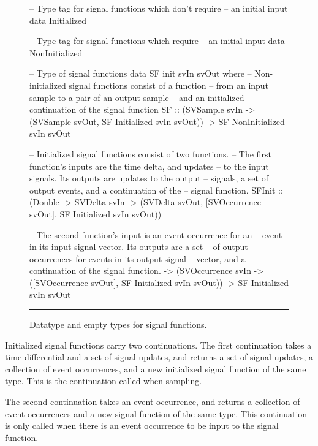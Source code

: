 \begin{figure}
\begin{code}
-- Type tag for signal functions which don't require
--  an initial input
data Initialized

-- Type tag for signal functions which require
--  an initial input
data NonInitialized

-- Type of signal functions
data SF init svIn svOut where
  -- Non-initialized signal functions consist of a function
  --  from an input sample to a pair of an output sample
  --  and an initialized continuation of the signal function
  SF     ::    (SVSample svIn 
                  -> (SVSample svOut,
                      SF Initialized svIn svOut)) 
            -> SF NonInitialized svIn svOut
  
  -- Initialized signal functions consist of two functions.
  -- The first function's inputs are the time delta, and updates
  --   to the input signals. Its outputs are updates to the output
  --   signals, a set of output events, and a continuation of the
  --   signal function.
  SFInit ::    (Double 
                  -> SVDelta svIn
                  -> (SVDelta svOut,
                      [SVOccurrence svOut],
                      SF Initialized svIn svOut)) 

  -- The second function's input is an event occurrence for an
  --   event in its input signal vector. Its outputs are a set 
  --   of output occurrences for events in its output signal
  --   vector, and a continuation of the signal function.
            -> (SVOccurrence svIn
                  -> ([SVOccurrence svOut],
                      SF Initialized svIn svOut))
            -> SF Initialized svIn svOut
\end{code}
\hrule
\caption{Datatype and empty types for signal functions.}
\label{figure:signal_function_datatype}
\end{figure}

Initialized signal functions carry two continuations. The first continuation
takes a time differential and a set of signal updates, and returns a set of
signal updates, a collection of event occurrences, and a new initialized signal
function of the same type. This is the continuation called when sampling.

The second continuation takes an event occurrence, and returns a collection of
event occurrences and a new signal function of the same type. This continuation
is only called when there is an event occurrence to be input to the signal
function.

